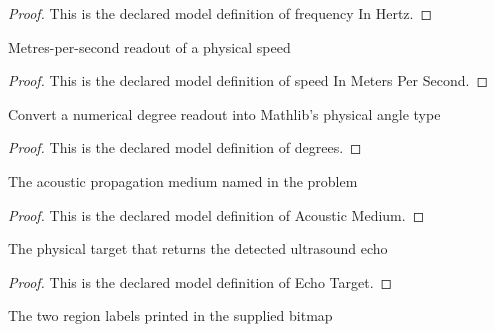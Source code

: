 \begin{proof}
  This is the declared model definition of frequency In Hertz.
\end{proof}
\begin{definition}
  \label{def:physics:phyx-mini-0324:phyxminiproblems-problemphyxmini0324-speedinmeterspersecond}
  Metres-per-second readout of a physical speed
\end{definition}
\begin{proof}
  This is the declared model definition of speed In Meters Per Second.
\end{proof}
\begin{definition}[degrees]
  \label{def:physics:phyx-mini-0324:phyxminiproblems-problemphyxmini0324-degrees}
  Convert a numerical degree readout into Mathlib's physical angle type
\end{definition}
\begin{proof}
  This is the declared model definition of degrees.
\end{proof}
\begin{definition}
  \label{def:physics:phyx-mini-0324:phyxminiproblems-problemphyxmini0324-acousticmedium}
  The acoustic propagation medium named in the problem
\end{definition}
\begin{proof}
  This is the declared model definition of Acoustic Medium.
\end{proof}
\begin{definition}
  \label{def:physics:phyx-mini-0324:phyxminiproblems-problemphyxmini0324-echotarget}
  The physical target that returns the detected ultrasound echo
\end{definition}
\begin{proof}
  This is the declared model definition of Echo Target.
\end{proof}
\begin{definition}
  \label{def:physics:phyx-mini-0324:phyxminiproblems-problemphyxmini0324-figureregionlabel}
  The two region labels printed in the supplied bitmap
\end{definition}
